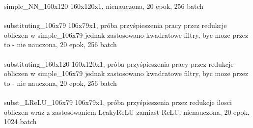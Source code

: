 simple_NN_160x120 160x120x1, nienauczona, 20 epok, 256 batch \\\\

substituting_106x79 106x79x1, próba przyśpieszenia pracy przez redukcje obliczen w
simple_106x79 jednak zastosowano kwadratowe filtry, byc moze przez to - nie nauczona, 20 epok, 256 batch \\\\

substituting_160x120 160x120x1, próba przyśpieszenia pracy przez redukcje obliczen w
simple_106x79 jednak zastosowano kwadratowe filtry, byc moze przez to - nie nauczona, 20 epok, 256 batch \\\\

subst_LReLU_106x79 106x79x1, próba przyśpieszenia przez redukcje ilosci obliczen wraz
z zastosowaniem LeakyReLU zamiast ReLU, nienauczona, 20 epok, 1024 batch \\\\
